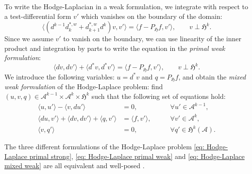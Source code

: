 \documentclass[reqno]{amsart}
\numberwithin{equation}{section}
\theoremstyle{definition}
\newcommand{\Ac}{\mathcal{A}}
\newcommand{\Hf}{\mathfrak{H}}
\begin{document}
To write the Hodge-Laplacian in a weak formulation, we integrate with respect to a test-differential form $v'$ which vanishes on the boundary of the domain:
\begin{equation}
\langle (d^{k-1} d^{*,w}_k + d_{k+1}^{*,w} d^k) v, v' \rangle = \langle f - P_\Hf f, v' \rangle, \qquad v \perp \Hf^k.
\end{equation}
Since we assume $v'$ to vanish on the boundary, we can use linearity of the inner product and integration by parts to write the equation in the \emph{primal weak formulation}:
\begin{equation}\label{eq: Hodge-Laplace primal weak}
\langle dv, dv' \rangle + \langle d^*v, d^*v' \rangle = \langle f - P_\Hf f, v' \rangle, \qquad v \perp \Hf^k.
\end{equation}
We introduce the following variables: $u = d^*v$ and $q = P_\Hf f$, and obtain the \emph{mixed weak formulation} of the Hodge-Laplace problem: find $(u,v,q) \in \Ac^{k-1} \times \Ac^{k} \times \Hf^k$ such that the following set of equations hold:
\begin{subequations}\label{eq: Hodge-Laplace mixed weak}
\begin{align}
\langle u, u' \rangle - \langle v, du' \rangle &= 0, \qquad &\forall u' \in \Ac^{k-1}, \\
\langle du, v' \rangle + \langle dv, dv' \rangle + \langle q, v' \rangle &= \langle f, v' \rangle, \qquad &\forall v' \in \Ac^k, \\
\langle v, q' \rangle &= 0, \qquad &\forall q' \in \Hf^k(\Ac).
\end{align}
\end{subequations}

The three different formulations of the Hodge-Laplace problem \cref{eq: Hodge-Laplace primal strong}, \cref{eq: Hodge-Laplace primal weak} and \cref{eq: Hodge-Laplace mixed weak} are all equivalent and well-posed \cite[Theorem 4.7 and 4.8]{arnoldFEEC}.
\end{document}
